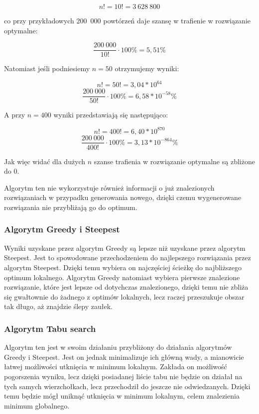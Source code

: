 $$ n! = 10! = 3~628~800 $$

co przy przykładowych 200~000 powtórzeń daje szansę w trafienie w rozwiązanie optymalne:

$$ \frac{200~000}{10!} \cdot 100\% = 5,51\%  $$

Natomiast jeśli podniesiemy $ n = 50 $ otrzymujemy wyniki:

$$ n! = 50! = 3,04 * 10^{64} $$
$$ \frac{200~000}{50!} \cdot 100\% = 6,58 * 10^{-58}\%  $$

A przy $ n = 400 $ wyniki przedstawiają się następująco:

$$ n! = 400! = 6,40 * 10^{870} $$
$$ \frac{200~000}{400!} \cdot 100\% = 3,13 * 10^{-864}\%  $$

Jak więc widać dla dużych $ n $ szanse trafienia w rozwiązanie optymalne są zbliżone do $ 0 $.

Algorytm ten nie wykorzystuje również informacji o już znalezionych rozwiązaniach 
w przypadku generowania nowego, dzięki czemu wygenerowane rozwiązania nie przybliżają
go do optimum.

\subsubsection{Algorytm Greedy i Steepest}

Wyniki uzyskane przez algorytm Greedy są lepsze niż uzyskane przez algorytm Steepest. 
Jest to spowodowane przechodzeniem do najlepszego rozwiązania przez algorytm Steepest. 
Dzięki temu wybiera on najczęściej ścieżkę do najbliższego optimum lokalnego. Algorytm
Greedy natomiast wybiera pierwsze znalezione rozwiązanie, które jest lepsze od dotychczas 
znalezionego, dzięki temu nie zbliża się gwałtownie do żadnego z optimów lokalnych, lecz 
raczej przeszukuje obszar tak długo, aż znajdzie ślepy zaułek.

\subsubsection{Algorytm Tabu search}

Algorytm ten jest w swoim działaniu przybliżony do działania algorytmów Greedy i Steepest.
Jest on jednak minimalizuje ich główną wady, a mianowicie łatwej możliwości utknięcia w 
minimum lokalnym. Zakłada on możliwość pogorszenia wyniku, lecz dzięki posiadanej liście 
tabu nie będzie on działał na tych samych wierzchołkach, lecz przechodził do jeszcze nie 
odwiedzanych. Dzięki temu będzie mógł uniknąć utknięcia w minimum lokalnym, celem znalezienia
minimum globalnego.



